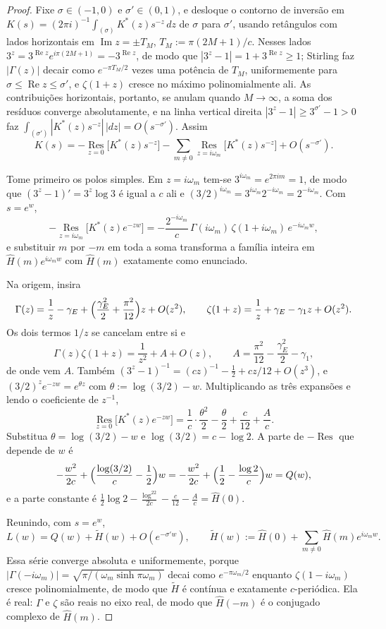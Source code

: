 \documentclass[11pt]{amsart}
\theoremstyle{plain}
\theoremstyle{definition}
\theoremstyle{remark}
\begin{document}
\begin{proof}
Fixe $\sigma\in(-1,0)$ e $\sigma'\in(0,1)$, e desloque o contorno de inversão em
$K(s)=(2\pi i)^{-1}\int_{(\sigma)}K^*(z)s^{-z}\,dz$ de $\sigma$ para $\sigma'$, usando retângulos com
lados horizontais em $\operatorname{Im}z=\pm T_M$, $T_M:=\pi(2M+1)/c$. Nesses lados
$3^z=3^{\operatorname{Re}z}e^{i\pi(2M+1)}=-3^{\operatorname{Re}z}$, de modo que $|3^z-1| =
1+3^{\operatorname{Re}z}\ge1$; Stirling faz $|\Gamma(z)|$ decair como $e^{-\pi T_M/2}$ vezes uma
potência de $T_M$, uniformemente para $\sigma\le\operatorname{Re}z\le\sigma'$, e $\zeta(1+z)$ cresce
no máximo polinomialmente ali. As contribuições horizontais, portanto, se anulam quando
$M\to\infty$, a soma dos resíduos converge absolutamente, e na linha vertical direita
$|3^z-1|\ge3^{\sigma'}-1>0$ faz $\int_{(\sigma')}|K^*(z)s^{-z}|\,|dz| = O(s^{-\sigma'})$. Assim
\[
K(s) = -\operatorname*{Res}_{z=0}\bigl[K^*(z)s^{-z}\bigr]
-\sum_{m\ne0}\operatorname*{Res}_{z=i\omega_m}\bigl[K^*(z)s^{-z}\bigr]+O(s^{-\sigma'}).
\]

Tome primeiro os polos simples. Em $z=i\omega_m$ tem-se $3^{i\omega_m}=e^{2\pi im}=1$, de modo que
$(3^z-1)'=3^z\log3$ é igual a $c$ ali e $(3/2)^{i\omega_m}=3^{i\omega_m}2^{-i\omega_m}=
2^{-i\omega_m}$. Com $s=e^w$,
\[
-\operatorname*{Res}_{z=i\omega_m}\bigl[K^*(z)e^{-zw}\bigr]
= -\frac{2^{-i\omega_m}}{c}\,\Gamma(i\omega_m)\,\zeta(1+i\omega_m)\,e^{-i\omega_m w},
\]
e substituir $m$ por $-m$ em toda a soma transforma a família inteira em $\hat H(m)e^{i\omega_m w}$
com $\hat H(m)$ exatamente como enunciado.

Na origem, insira
\[
\Gamma(z) = \frac1z-\gamma_E+\Bigl(\frac{\gamma_E^2}{2}+\frac{\pi^2}{12}\Bigr)z+O(z^2), \qquad
\zeta(1+z) = \frac1z+\gamma_E-\gamma_1 z+O(z^2).
\]
Os dois termos $1/z$ se cancelam entre si e
\[
\Gamma(z)\zeta(1+z) = \frac{1}{z^2}+A+O(z), \qquad A = \frac{\pi^2}{12}-\frac{\gamma_E^2}{2}-\gamma_1,
\]
de onde vem $A$. Também $(3^z-1)^{-1} = (cz)^{-1}-\tfrac12+cz/12+O(z^3)$, e
$(3/2)^ze^{-zw}=e^{\theta z}$ com $\theta:=\log(3/2)-w$. Multiplicando as três expansões e lendo o
coeficiente de $z^{-1}$,
\[
\operatorname*{Res}_{z=0}\bigl[K^*(z)e^{-zw}\bigr]
= \frac1c\cdot\frac{\theta^2}{2}-\frac{\theta}{2}+\frac{c}{12}+\frac{A}{c}.
\]
Substitua $\theta=\log(3/2)-w$ e $\log(3/2)=c-\log2$. A parte de $-\operatorname{Res}$ que depende
de $w$ é
\[
-\frac{w^2}{2c}+\Bigl(\frac{\log(3/2)}{c}-\frac12\Bigr)w
= -\frac{w^2}{2c}+\Bigl(\frac12-\frac{\log2}{c}\Bigr)w = Q(w),
\]
e a parte constante é
$\tfrac12\log2-\tfrac{\log^22}{2c}-\tfrac{c}{12}-\tfrac Ac = \hat H(0)$.

Reunindo, com $s=e^w$,
\[
L(w) = Q(w)+\widetilde H(w)+O(e^{-\sigma' w}), \qquad
\widetilde H(w) := \hat H(0)+\sum_{m\ne0}\hat H(m)e^{i\omega_m w}.
\]
Essa série converge absoluta e uniformemente, porque $|\Gamma(-i\omega_m)| =
\sqrt{\pi/(\omega_m\sinh\pi\omega_m)}$ decai como $e^{-\pi\omega_m/2}$ enquanto $\zeta(1-i\omega_m)$
cresce polinomialmente, de modo que $\widetilde H$ é contínua e exatamente $c$-periódica. Ela é
real: $\Gamma$ e $\zeta$ são reais no eixo real, de modo que $\hat H(-m)$ é o conjugado complexo de
$\hat H(m)$.


\end{proof}
\end{document}

